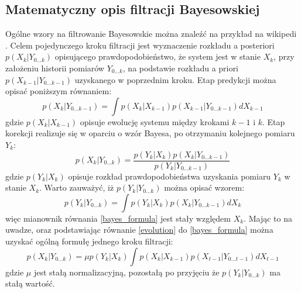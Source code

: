 \documentclass[10pt,a4paper]{article}
\begin{document}
\subsection{Matematyczny opis filtracji Bayesowskiej}
Ogólne wzory na filtrowanie Bayesowskie można znaleźć na przykład na wikipedi \cite{wiki_bayes_filter}. Celem pojedynczego kroku filtracji jest wyznaczenie rozkładu a posteriori $p(X_{k}|Y_{0...k})$ opisującego prawdopodobieństwo, że system jest w stanie $X_k$, przy założeniu historii pomiarów $Y_{0...k}$, na podstawie rozkładu a priori $p(X_{k-1}|Y_{0...k-1})$ uzyskanego w poprzednim kroku. Etap predykcji można opisać poniższym równaniem:
\begin{equation} \label{evolution}
	p(X_k|Y_{0...k-1})=\int p(X_k|X_{k-1})p(X_{k-1}|Y_{0...k-1}) dX_{k-1}
\end{equation}
gdzie $p(X_k|X_{k-1})$ opisuje ewolucję systemu między krokami $k-1$ i $k$. Etap korekcji realizuje się w oparciu o wzór Bayesa, po otrzymaniu kolejnego pomiaru $Y_k$:
\begin{equation}\label{bayes_formula}
	p(X_k|Y_{0...k})=\frac{p(Y_k|X_k)p(X_k|Y_{0...k-1})}{p(Y_k|Y_{0...k-1})}
\end{equation}
gdzie $p(Y_k|X_k)$ opisuje rozkład prawdopodobieństwa uzyskania pomiaru $Y_k$ w stanie $X_k$. Warto zauważyć, iż $p(Y_k|Y_{0...k})$ można opisać wzorem:
\begin{equation}
p(Y_k|Y_{0...k})=\int p(Y_k|X_k)p(X_k|Y_{0...k-1}) dX_k
\end{equation}
więc mianownik równania \ref{bayes_formula} jest stały względem $X_k$. Mając to na uwadze, oraz podstawiając równanie \ref{evolution} do \ref{bayes_formula} można uzyskać ogólną formułę jednego kroku filtracji:
\begin{equation}
	p(X_k|Y_{0...k})=\mu p(Y_k|X_k)\int p(X_k|X_{k-1})p(X_{t-1}|Y_{0...t-1}) dX_{t-1}
\end{equation}
gdzie $\mu$ jest stałą normalizacyjną, pozostałą po przyjęciu że $p(Y_k|Y_{0...k})$ ma stałą wartość.
\end{document}
